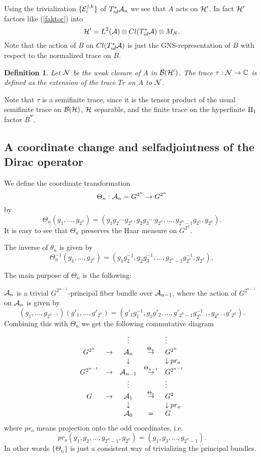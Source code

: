 \documentclass[12pt]{article}
\def\ca{{\cal A}}
\def\cb{{\cal B}}
\def\ce{{\cal E}}
\def\ch{{\cal H}}
\def\cn{{\cal N}}
\newtheorem{definition}[thm]{Definition}
\newcommand{\bbC}{{\Bbb C}}
\begin{document}
{Using  the trivialization $\{\ce_i^{j,k}\}$ of $T^*_{id}\ca_{n}$ we see that  $A$ acts on $\ch'$. In fact $\ch'$ factors like (\ref{faktor}) into
$$\ch'=L^2(\ca )\otimes Cl(T^*_{id}\ca)\otimes M_N.$$
Note that the action of $B$ on $Cl(T^*_{id}\ca)$ is just the GNS-representation of $B$ with respect to the normalized trace on $B$.
\begin{definition}
Let $\cn$ be the weak closure of $A$ in $\cb (\ch')$. The trace $\tau :\cn \to \bbC$ is defined as the extension of the trace $Tr$ on $A$ to $\cn$. 
\end{definition}

Note that $\tau$ is a semifinite trace, since it is the tensor product of the usual semifinite trace on $\cb(\ch)$, $\ch$ separable, and the finite trace on the hyperfinite $\hbox{II}_1$ factor $\overline{B}^w$. 

\subsection{A coordinate change and selfadjointness of the Dirac operator} 
We define the coordinate transformation 
$$\Theta_{n}:\ca_{n}=G^{2^n}\to G^{2^n}$$
by 
$$\Theta_{n} (g_1,\ldots, g_{2^n})=(g_1g_2\cdots g_{2^n},g_2g_3\cdots g_{2^n},\ldots , g_{2^n-1}g_{2^n} , g_{2^n}).$$
It is easy to see that $\Theta_{n}$ preserves the Haar measure on $G^{2^n}$.

The inverse of $\theta_n$ is given by
$$\Theta_{n}^{-1}(g_1,\ldots ,g_{2^n})=(g_1g_2^{-1},g_2g_3^{-1},\ldots, g_{2^n-1}g_{2^{n}}^{-1},g_{2^{n}}),$$

The main purpose of $\Theta_{n}$ is the following:

$\ca_{n}$ is a trivial $G^{2^{n-1}}$-principal fiber bundle over $\ca_{n-1}$, where the action of $G^{2^{n-1}}$ on $\ca_{n}$ is given by
$$(g_1,\ldots ,g_{2^{n-1}})(g'_1,\ldots,g'_{2^n})=(g'_1g_1^{-1},g_1g'_2,\ldots , g'_{2^n-1}g_{2^{n-1}}^{-1},g_{2^{n-1}}g'_{2^n}).$$
Combining this with $\Theta_{n}$ we get the following commutative diagram
\begin{displaymath}
\begin{array}{ccccl}
&&\vdots&&\vdots\\
G^{2^{n}}&\to & \ca_{n}&\stackrel{\Theta_{n}}{\rightarrow}&G^{2^{n}} \\
&&\downarrow&&\downarrow pr_o\\
G^{2^{n-1}}&\to &\ca_{n-1}&\stackrel{\Theta_{n-1}}{\rightarrow}&G^{2^{n-1}}\\
&&\vdots&&\vdots\\
G&\to &\ca_{1}&\stackrel{\Theta_1}{\rightarrow}&G^2\\
&&\downarrow&&\downarrow pr_o\\
&&\ca_{0}&=&G
\end{array}
\end{displaymath}
where $pr_o$ means projection onto the odd coordinates, i.e. 
$$pr_o(g_1,g_2,\ldots,g_{2^n-1},g_{2^n})=(g_1,g_3,\ldots ,g_{2^n-1}).$$ 
In other words $\{ \Theta_n\}$ is just a consistent way of trivializing the principal bundles. 

}
\end{document}
